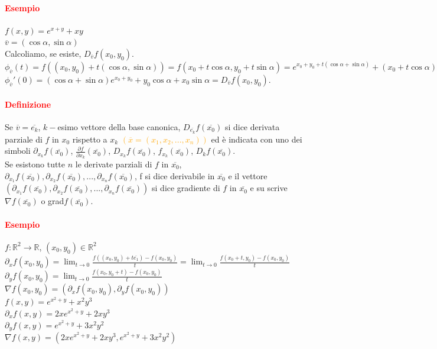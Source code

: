 \documentclass{article}
\newcommand{\R}{\mathbb{R}}
\begin{document}
\paragraph{\textcolor{red}{Esempio}}
$f(x,y)=e^{x+y}+xy$\\
$\overline{v}=(\cos\alpha,\sin\alpha)$\\
Calcoliamo, se esiste, $D_{\overline{v}}f(x_0,y_0)$.\\
$\phi_{\overline{v}}(t)=f((x_0,y_0)+t(\cos\alpha,\sin\alpha))=f(x_0+t\cos\alpha,y_0+t\sin\alpha)=e^{x_0+y_0+t(\cos\alpha+\sin\alpha)}+(x_0+t\cos\alpha)(y_0+t\sin\alpha)$\\
$\phi_{\overline{v}}'(0)=(\cos\alpha+\sin\alpha)e^{x_0+y_0}+y_0\cos\alpha+x_0\sin\alpha=D_{\overline{v}}f(x_0,y_0)$.

\paragraph{\textcolor{red}{Definizione}}
Se $\overline{v}=\overline{e_k}$, $k-$esimo vettore della base canonica, $D_{\overline{e_k}}f(\overline{x_0})$ si dice derivata parziale di $f$ in $x_0$ rispetto a $x_k$ \textcolor{orange}{$(\overline{x}=(x_1,x_2,...,x_n))$} ed è indicata con uno dei simboli $\partial_{x_k}f(\overline{x_0})$, $\frac{\partial f}{\partial x_k}(\overline{x_0})$, $D_{x_k}f(\overline{x_0})$, $f_{x_k}(\overline{x_0})$, $D_kf(\overline{x_0})$.\\
Se esistono tutte $n$ le derivate parziali di $f$ in $\overline{x_0}$, $\partial_{x_1}f(\overline{x_0}),\partial_{x_2}f(\overline{x_0}),...,\partial_{x_n}f(\overline{x_0})$, f si dice derivabile in $\overline{x_0}$ e il vettore $(\partial_{x_1}f(\overline{x_0}),\partial_{x_2}f(\overline{x_0}),...,\partial_{x_n}f(\overline{x_0}))$ si dice gradiente di $f$ in $\overline{x_0}$ e su scrive $\nabla f(\overline{x_0})$ o grad$f(\overline{x_0})$.

\paragraph{\textcolor{red}{Esempio}}
$f:\R^2\rightarrow\R$, $(x_0,y_0)\in\R^2$\\
$\partial_xf(x_0,y_0)=\lim_{t\rightarrow0}\frac{f((x_0,y_0)+t\overline{e_1})-f(x_0,y_0)}{t}=\lim_{t\rightarrow0}\frac{f(x_0+t,y_0)-f(x_0,y_0)}{t}$\\
$\partial_y f(x_0,y_0)=\lim_{t \rightarrow 0}\frac{f(x_0,y_0+t)-f(x_0,y_0)}{t}$\\
$\nabla f(x_0,y_0)=(\partial_xf(x_0,y_0),\partial_yf(x_0,y_0))$\\
$f(x,y)=e^{x^2+y}+x^2y^3$\\
$\partial_xf(x,y)=2xe^{x^2+y}+2xy^3$\\
$\partial_yf(x,y)=e^{x^2+y}+3x^2y^2$\\
$\nabla f(x,y)=(2xe^{x^2+y}+2xy^3,e^{x^2+y}+3x^2y^2)$
\end{document}
